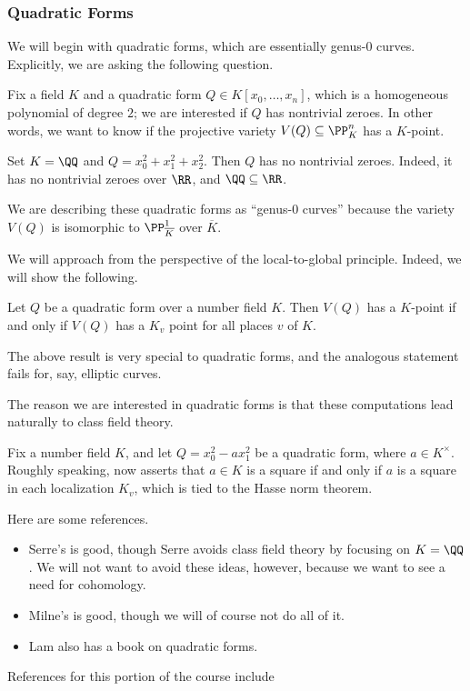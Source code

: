 \documentclass[../notes.tex]{subfiles}
\begin{document}
\subsubsection{Quadratic Forms}
We will begin with quadratic forms, which are essentially genus-$0$ curves. Explicitly, we are asking the following question.
\begin{ques} \label{ques:quad-form}
	Fix a field $K$ and a quadratic form $Q\in K[x_0,\ldots,x_n]$, which is a homogeneous polynomial of degree $2$; we are interested if $Q$ has nontrivial zeroes. In other words, we want to know if the projective variety $V(Q)\subseteq\PP^n_K$ has a $K$-point.
\end{ques}
\begin{example}
	Set $K=\QQ$ and $Q=x_0^2+x_1^2+x_2^2$. Then $Q$ has no nontrivial zeroes. Indeed, it has no nontrivial zeroes over $\RR$, and $\QQ\subseteq\RR$.
\end{example}
\begin{remark}
	We are describing these quadratic forms as ``genus-$0$ curves'' because the variety $V(Q)$ is isomorphic to $\PP^1_{\overline K}$ over $\overline K$.
\end{remark}
We will approach  from the perspective of the local-to-global principle. Indeed, we will show the following.
\begin{theorem} \label{thm:local-global-quad-form}
	Let $Q$ be a quadratic form over a number field $K$. Then $V(Q)$ has a $K$-point if and only if $V(Q)$ has a $K_v$ point for all places $v$ of $K$.
\end{theorem}
The above result  is very special to quadratic forms, and the analogous statement fails for, say, elliptic curves.

The reason we are interested in quadratic forms is that these computations lead naturally to class field theory.
\begin{example}
	Fix a number field $K$, and let $Q=x_0^2-ax_1^2$ be a quadratic form, where $a\in K^\times$. Roughly speaking,  now asserts that $a\in K$ is a square if and only if $a$ is a square in each localization $K_v$, which is tied to the Hasse norm theorem.
\end{example}
Here are some references.
\begin{itemize}
	\item Serre's \cite{course-arithmetic} is good, though Serre avoids class field theory by focusing on $K=\QQ$. We will not want to avoid these ideas, however, because we want to see a need for cohomology.
	\item Milne's \cite{milne-cft} is good, though we will of course not do all of it.
	\item Lam also has a book \cite{lam-quad-forms} on quadratic forms.
\end{itemize}
References for this portion of the course include 
\end{document}
